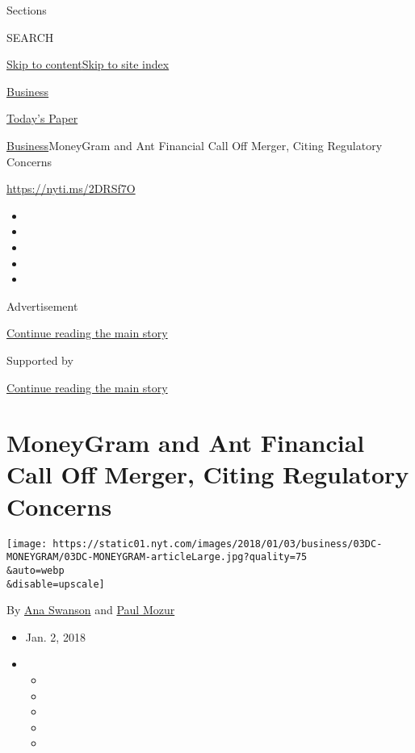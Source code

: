 Sections

SEARCH

\protect\hyperlink{site-content}{Skip to
content}\protect\hyperlink{site-index}{Skip to site index}

\href{https://www.nytimes.com/section/business}{Business}

\href{https://myaccount.nytimes.com/auth/login?response_type=cookie\&client_id=vi}{}

\href{https://www.nytimes.com/section/todayspaper}{Today's Paper}

\href{/section/business}{Business}\textbar{}MoneyGram and Ant Financial
Call Off Merger, Citing Regulatory Concerns

\url{https://nyti.ms/2DRSf7O}

\begin{itemize}
\item
\item
\item
\item
\item
\end{itemize}

Advertisement

\protect\hyperlink{after-top}{Continue reading the main story}

Supported by

\protect\hyperlink{after-sponsor}{Continue reading the main story}

\hypertarget{moneygram-and-ant-financial-call-off-merger-citing-regulatory-concerns}{%
\section{MoneyGram and Ant Financial Call Off Merger, Citing Regulatory
Concerns}\label{moneygram-and-ant-financial-call-off-merger-citing-regulatory-concerns}}

\texttt{[image: https://static01.nyt.com/images/2018/01/03/business/03DC-MONEYGRAM/03DC-MONEYGRAM-articleLarge.jpg?quality=75\\\&auto=webp\\\&disable=upscale]}

By \href{https://www.nytimes.com/by/ana-swanson}{Ana Swanson} and
\href{https://www.nytimes.com/by/paul-mozur}{Paul Mozur}

\begin{itemize}
\item
  Jan. 2, 2018
\item
  \begin{itemize}
  \item
  \item
  \item
  \item
  \item
  \end{itemize}
\end{itemize}

